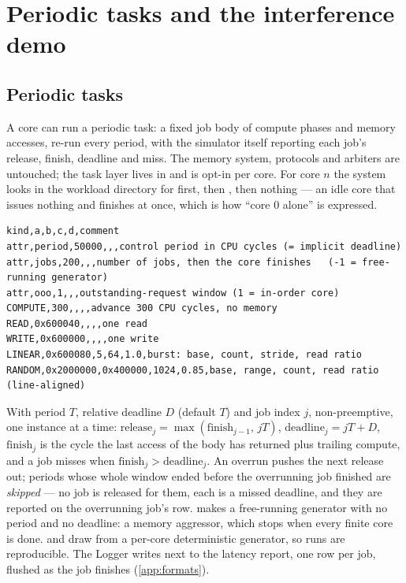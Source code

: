 \chapter[Tasks and the demo]{Periodic tasks and the interference demo}\label{ch:tasks-and-demo}


\section{Periodic tasks}

A core can run a periodic task: a fixed job body of compute phases and memory accesses, re-run
every period, with the simulator itself reporting each job's release, finish, deadline and
miss. The memory system, protocols and arbiters are untouched; the task layer lives in
 and is opt-in per core. For core $n$ the system looks in the workload
directory for  first, then , then nothing
--- an idle core that issues nothing and finishes at once, which is how ``core 0 alone'' is
expressed.

\begin{lstlisting}[style=csv,caption={A task program. \code{attr} rows set the task's parameters; the phase rows are the job body.}]
kind,a,b,c,d,comment
attr,period,50000,,,control period in CPU cycles (= implicit deadline)
attr,jobs,200,,,number of jobs, then the core finishes   (-1 = free-running generator)
attr,ooo,1,,,outstanding-request window (1 = in-order core)
COMPUTE,300,,,,advance 300 CPU cycles, no memory
READ,0x600040,,,,one read
WRITE,0x600000,,,,one write
LINEAR,0x600080,5,64,1.0,burst: base, count, stride, read ratio
RANDOM,0x2000000,0x400000,1024,0.85,base, range, count, read ratio (line-aligned)
\end{lstlisting}

With period $T$, relative deadline $D$ (default $T$) and job index $j$, non-preemptive, one
instance at a time: $\mathrm{release}_j = \max(\mathrm{finish}_{j-1},\, jT)$,
$\mathrm{deadline}_j = jT + D$, $\mathrm{finish}_j$ is the cycle the last access of the body has
returned plus trailing compute, and a job misses when $\mathrm{finish}_j > \mathrm{deadline}_j$.
An overrun pushes the next release out; periods whose whole window ended before the overrunning
job finished are \emph{skipped} --- no job is released for them, each is a missed deadline, and
they are reported on the overrunning job's row.  makes a free-running
generator with no period and no deadline: a memory aggressor, which stops when every finite
core is done.  and  draw from a per-core deterministic generator, so
runs are reproducible. The Logger writes  next to the latency report,
one row per job, flushed as the job finishes (\cref{app:formats}).

